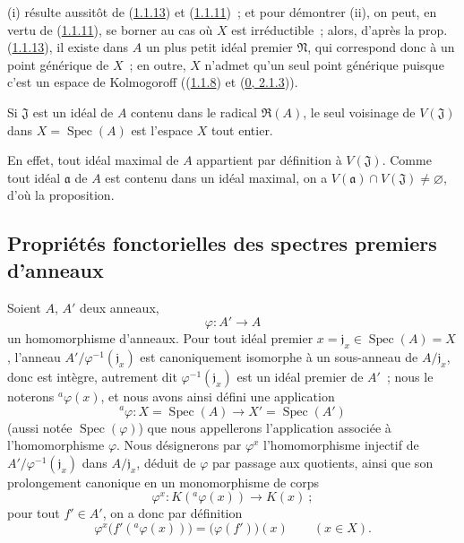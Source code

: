 (i) résulte aussitôt de (\hyperref[I.1.1.13-fr]{1.1.13}) et
(\hyperref[I.1.1.11-fr]{1.1.11})~; et pour démontrer (ii), on peut, en vertu de
(\hyperref[I.1.1.11-fr]{1.1.11}), se borner au cas où $X$ est irréductible~;
alors, d'après la prop. (\hyperref[I.1.1.13-fr]{1.1.13}), il existe dans $A$
un plus petit idéal premier $\mathfrak{N}$, qui correspond donc à un point
générique
de $X$~; en outre, $X$ n'admet qu'un seul point générique puisque c'est un
espace de Kolmogoroff ((\hyperref[I.1.1.8-fr]{1.1.8}) et
(\hyperref[0.2.1.3-fr]{0, 2.1.3})).

\begin{proposition}[1.1.15]
\label{I.1.1.15-fr}
Si $\mathfrak{J}$ est un idéal de $A$ contenu dans le radical
$\mathfrak{R}(A)$, le seul voisinage de $V(\mathfrak{J})$ dans
$X=\operatorname{Spec}(A)$ est l'espace $X$ tout entier.
\end{proposition}

En effet, tout idéal maximal de $A$ appartient par définition à
$V(\mathfrak{J})$. Comme tout idéal $\mathfrak{a}$ de $A$ est contenu dans un
idéal maximal, on a $V(\mathfrak{a})\cap V(\mathfrak{J})\neq\varnothing$,
d'où la proposition.

\subsection{Propriétés fonctorielles des spectres premiers d'anneaux}
\label{subsection:I.1.2-fr}

\begin{env}[1.2.1]
\label{I.1.2.1-fr}
Soient $A$, $A'$ deux anneaux,
\[
  \varphi:A'\longrightarrow A
\]
un homomorphisme d'anneaux. Pour tout idéal premier
$x=\mathfrak{j}_x\in\operatorname{Spec}(A)=X$, l'anneau
$A'/\varphi^{-1}(\mathfrak{j}_x)$ est canoniquement isomorphe à un
sous-anneau de $A/\mathfrak{j}_x$, donc est intègre, autrement dit
$\varphi^{-1}(\mathfrak{j}_x)$ est un idéal premier de $A'$~; nous le
noterons ${}^a\varphi(x)$, et nous avons ainsi défini une application
\[
  {}^a\varphi:X=\operatorname{Spec}(A)\longrightarrow
  X'=\operatorname{Spec}(A')
\]
(aussi notée $\operatorname{Spec}(\varphi)$) que nous appellerons
l'application associée à l'homomorphisme $\varphi$. Nous désignerons par
$\varphi^x$ l'homomorphisme injectif de
$A'/\varphi^{-1}(\mathfrak{j}_x)$ dans $A/\mathfrak{j}_x$, déduit de
$\varphi$ par passage aux quotients, ainsi que son prolongement canonique en
un monomorphisme de corps
\[
  \varphi^x:K({}^a\varphi(x))\longrightarrow K(x)~;
\]
pour tout $f'\in A'$, on a donc par définition
\begin{equation}
  \varphi^x\bigl(f'({}^a\varphi(x))\bigr)=\bigl(\varphi(f')\bigr)(x)
  \qquad(x\in X).
  \tag{1.2.1.1}\label{I.1.2.1.1-fr}
\end{equation}
\end{env}

